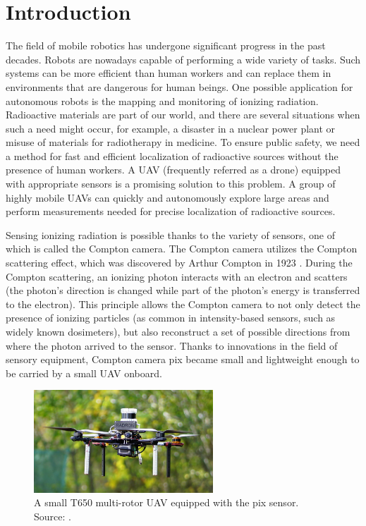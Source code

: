 \chapter{Introduction\label{chap:introduction}}
The field of mobile robotics has undergone significant progress in the past decades.
Robots are nowadays capable of performing a wide variety of tasks. 
Such systems can be more efficient than human workers and can replace them in environments that are dangerous for human beings.
One possible application for autonomous robots is the mapping and monitoring of ionizing radiation. 
Radioactive materials are part of our world, and there are several situations when such a need might occur, for example, a disaster in a nuclear power plant or misuse of materials for radiotherapy in medicine. 
To ensure public safety, we need a method for fast and efficient localization of radioactive sources without the presence of human workers.
A \ac{UAV} (frequently referred as a drone) equipped with appropriate sensors is a promising solution to this problem.
A group of highly mobile \ac{UAV}s can quickly and autonomously explore large areas and perform measurements needed for precise localization of radioactive sources.

Sensing ionizing radiation is possible thanks to the variety of sensors, one of which is called the Compton camera.
The Compton camera utilizes the Compton scattering effect, which was discovered by Arthur Compton in 1923 \cite{compton}.
During the Compton scattering, an ionizing photon interacts with an electron and scatters (the photon's direction is changed while part of the photon's energy is transferred to the electron).
This principle allows the Compton camera to not only detect the presence of ionizing particles (as common in intensity-based sensors, such as widely known dosimeters), but also reconstruct a set of possible directions from where the photon arrived to the sensor.
Thanks to innovations in the field of sensory equipment, Compton camera \ac{pix} became small and lightweight enough to be carried by a small \ac{UAV} onboard.


\begin{figure}[!h]
    \centering
  \includegraphics[width=0.6\textwidth]{./fig/photos/uav.jpg}
    \caption{A small T650 multi-rotor UAV equipped with the \ac{pix} sensor. Source: \cite{baca2021gamma}.}
    \label{fig:uavvv}
\end{figure}

